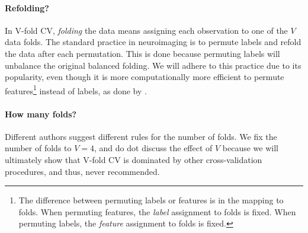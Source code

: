 \documentclass[12pt,a4paper]{article}
\begin{document}
\paragraph{Refolding?}
In V-fold CV, \emph{folding} the data means assigning each observation to one of the $V$ data folds. 
The standard practice in neuroimaging is to permute labels and refold the data after each permutation. 
This is done because permuting labels will unbalance the original balanced folding.
We will adhere to this practice due to its popularity, even though it is more computationally more efficient to permute features\footnote{The difference between permuting labels or features is in the mapping to folds. When permuting features, the \textit{label} assignment to folds is fixed. When permuting labels, the \textit{feature} assignment to folds is fixed.} instead of labels, as done by \citet{golland_permutation_2005}.


\paragraph{How many folds?}
Different authors suggest different rules for the number of folds. 
We fix the number of folds to $V=4$, and do dot discuss the effect of $V$ because we will ultimately show that V-fold CV is dominated by other cross-validation procedures, and thus, never recommended. 

\bigskip
\end{document}
